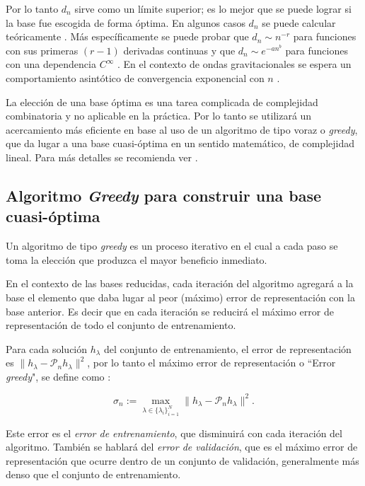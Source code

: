 Por lo tanto $d_n$ sirve como un límite superior; es lo mejor que se puede lograr si la base fue escogida de forma óptima.
En algunos casos $d_n$ se puede calcular teóricamente \cite{MAGARILILYAEV200197}. Más específicamente se puede probar que $d_n \sim n^{-r}$ para funciones con sus primeras $(r-1)$ derivadas continuas y que $d_n \sim e^{-an^b}$ para funciones con una dependencia $C^{\infty}$  \cite{articleg}. En el contexto de ondas gravitacionales se espera un comportamiento asintótico de convergencia exponencial con $n$ \citep{PhysRevX.4.031006, Herrmann:2012xpx}.

La elección de una base óptima es una tarea complicada de complejidad combinatoria y no aplicable en la práctica. Por lo tanto se utilizará un acercamiento más eficiente en base al uso de un algoritmo de tipo voraz o \textit{greedy}, que da lugar a una base cuasi-óptima en un sentido matemático, de complejidad lineal. Para más detalles se recomienda ver \cite{Tiglio:2021ysj}.

\subsection{Algoritmo \textit{Greedy} para construir una base cuasi-óptima}

Un algoritmo de tipo \textit{greedy} es un proceso iterativo en el cual a cada paso se toma la elección que produzca el mayor beneficio inmediato.

En el contexto de las bases reducidas, cada iteración del algoritmo agregará a la base el elemento que daba lugar al peor (máximo) error de representación con la base anterior. Es decir que en cada iteración se reducirá el máximo error de representación de todo el conjunto de entrenamiento.

Para cada solución $h_{\lambda}$ del conjunto de entrenamiento, el error de representación es $\| h_{\lambda} - \mathcal{P}_nh_{\lambda} \|^2$, por lo tanto el máximo error de representación o ``Error \textit{greedy}", se define como :

\begin{equation}
\sigma_n := \max_{\lambda \in  \{ \lambda_{i}\}_{i=1}^N } \| h_{\lambda} - \mathcal{P}_nh_{\lambda} \|^2.
\end{equation}

Este error es el \textit{error de entrenamiento}, que disminuirá con cada iteración del algoritmo. También se hablará del \textit{error de validación}, que es el máximo error de representación que ocurre dentro de un conjunto de validación, generalmente más denso que el conjunto de entrenamiento.


